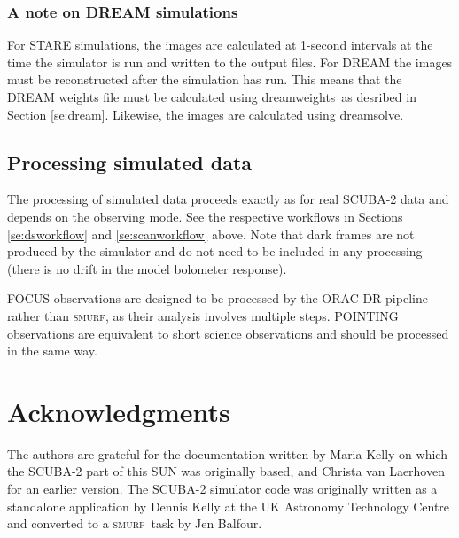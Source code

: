 \documentclass[twoside,11pt]{article}
\newcommand{\xref}[3]{#1}
\newcommand{\xlabel}[1]{}
\renewcommand{\_}{\texttt{\symbol{95}}}
\newcommand{\SMURF}{\textsc{smurf}}
\newcommand{\task}[1]{\textsf{#1}}
\newcommand{\dreamsolve}{\xref{\task{dreamsolve}}{sun258}{DREAMSOLVE}}
\newcommand{\dreamweights}{\xref{\task{dreamweights}}{sun258}{DREAMWEIGHTS}}
\begin{document}
\subsubsection{\xlabel{dreamsim}A note on DREAM simulations\label{se:dreamsim}}

For STARE simulations, the images are calculated at 1-second intervals
at the time the simulator is run and written to the output files. For
DREAM the images must be reconstructed after the simulation has
run. This means that the DREAM weights file must be calculated using
\dreamweights\ as desribed in Section \ref{se:dream}. Likewise, the
images are calculated using \dreamsolve.

\subsection{\xlabel{simdr}Processing simulated data\label{se:simdr}}

The processing of simulated data proceeds exactly as for real SCUBA-2
data and depends on the observing mode. See the respective workflows
in Sections \ref{se:dsworkflow} and \ref{se:scanworkflow} above. Note
that dark frames are not produced by the simulator and do not need to
be included in any processing (there is no drift in the model
bolometer response).

FOCUS observations are designed to be processed by the ORAC-DR
pipeline rather than \SMURF, as their analysis involves multiple
steps. POINTING observations are equivalent to short science
observations and should be processed in the same way.

\section{Acknowledgments}

The authors are grateful for the documentation written by Maria Kelly
on which the SCUBA-2 part of this SUN was originally based, and
Christa van Laerhoven for an earlier version. The SCUBA-2 simulator
code was originally written as a standalone application by Dennis
Kelly at the UK Astronomy Technology Centre and converted to a \SMURF\
task by Jen Balfour.

\end{document}
